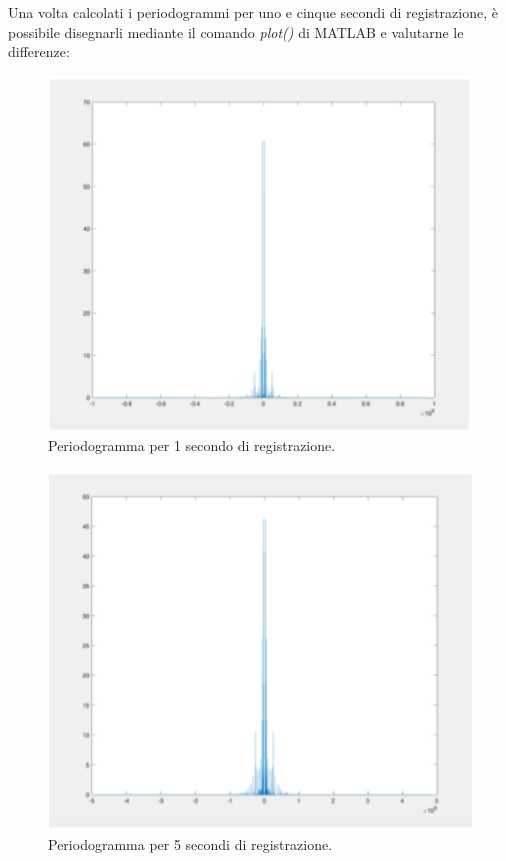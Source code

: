 \bigskip

Una volta calcolati i periodogrammi per uno e cinque secondi di registrazione, 
è possibile disegnarli mediante il comando \textit{plot()} di MATLAB e 
valutarne le diﬀerenze:

\begin{minipage}[t]{.45\textwidth}
	\begin{figure}[H]
		\includegraphics[width=\textwidth]{./images/cap4/per1s.png}
		\caption{Periodogramma per 1 secondo di registrazione.}
	\end{figure}
\end{minipage}
\hfill
\begin{minipage}[t]{.45\textwidth}
	\begin{figure}[H]
		\includegraphics[width=\textwidth]{./images/cap4/per5s.png}
		\caption{Periodogramma per 5 secondi di registrazione.}
	\end{figure}
\end{minipage}

